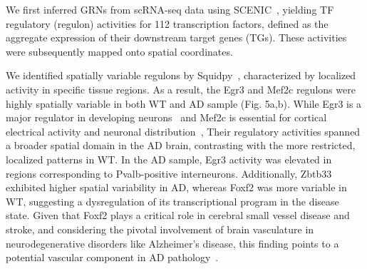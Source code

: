\documentclass[10pt,a4paper]{article}
\begin{document}
We first inferred GRNs from scRNA-seq data using SCENIC~\cite{Aibar2017}, yielding TF regulatory (regulon) activities for 112 transcription factors, defined as the aggregate expression of their downstream target genes (TGs). These activities were subsequently mapped onto spatial coordinates.

We identified spatially variable regulons by Squidpy~\cite{Palla2022}, characterized by localized activity in specific tissue regions. As a result, the Egr3 and Mef2c regulons were highly spatially variable in both WT and AD sample (Fig. 5a,b). While Egr3 is a major regulator in developing neurons~\cite{Egr3GABRA4} and Mef2c is essential for cortical electrical activity and neuronal distribution~\cite{Harrington2016,Li2008,Bridi2017}, Their regulatory activities spanned a broader spatial domain in the AD brain, contrasting with the more restricted, localized patterns in WT. In the AD sample, Egr3 activity was elevated in regions corresponding to Pvalb-positive interneurons. Additionally, Zbtb33 exhibited higher spatial variability in AD, whereas Foxf2 was more variable in WT, suggesting a dysregulation of its transcriptional program in the disease state. Given that Foxf2 plays a critical role in cerebral small vessel disease and stroke, and considering the pivotal involvement of brain vasculature in neurodegenerative disorders like Alzheimer's disease, this finding points to a potential vascular component in AD pathology~\cite{TodorovVolgyi2025, Sewell2025, Yang2022}.
\end{document}
